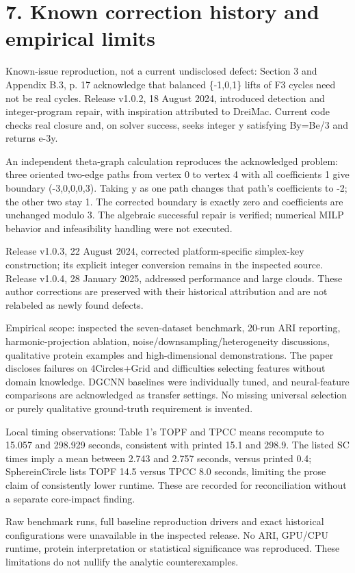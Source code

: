 \documentclass[10pt]{article}
\begin{document}
\section*{7. Known correction history and empirical limits}
Known-issue reproduction, not a current undisclosed defect: Section 3 and Appendix B.3, p. 17 acknowledge that balanced \{-1,0,1\} lifts of F3 cycles need not be real cycles. Release v1.0.2, 18 August 2024, introduced detection and integer-program repair, with inspiration attributed to DreiMac. Current code checks real closure and, on solver success, seeks integer y satisfying By=Be/3 and returns e-3y.\par
An independent theta-graph calculation reproduces the acknowledged problem: three oriented two-edge paths from vertex 0 to vertex 4 with all coefficients 1 give boundary (-3,0,0,0,3). Taking y as one path changes that path’s coefficients to -2; the other two stay 1. The corrected boundary is exactly zero and coefficients are unchanged modulo 3. The algebraic successful repair is verified; numerical MILP behavior and infeasibility handling were not executed.\par
Release v1.0.3, 22 August 2024, corrected platform-specific simplex-key construction; its explicit integer conversion remains in the inspected source. Release v1.0.4, 28 January 2025, addressed performance and large clouds. These author corrections are preserved with their historical attribution and are not relabeled as newly found defects.\par
Empirical scope: inspected the seven-dataset benchmark, 20-run ARI reporting, harmonic-projection ablation, noise/downsampling/heterogeneity discussions, qualitative protein examples and high-dimensional demonstrations. The paper discloses failures on 4Circles+Grid and difficulties selecting features without domain knowledge. DGCNN baselines were individually tuned, and neural-feature comparisons are acknowledged as transfer settings. No missing universal selection or purely qualitative ground-truth requirement is invented.\par
Local timing observations: Table 1’s TOPF and TPCC means recompute to 15.057 and 298.929 seconds, consistent with printed 15.1 and 298.9. The listed SC times imply a mean between 2.743 and 2.757 seconds, versus printed 0.4; SphereinCircle lists TOPF 14.5 versus TPCC 8.0 seconds, limiting the prose claim of consistently lower runtime. These are recorded for reconciliation without a separate core-impact finding.\par
Raw benchmark runs, full baseline reproduction drivers and exact historical configurations were unavailable in the inspected release. No ARI, GPU/CPU runtime, protein interpretation or statistical significance was reproduced. These limitations do not nullify the analytic counterexamples.\par
\end{document}
